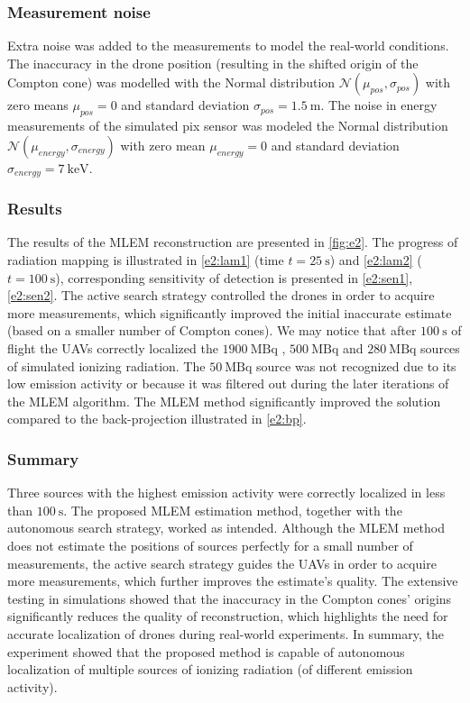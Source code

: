 \subsubsection{Measurement noise}
Extra noise was added to the measurements to model the real-world conditions.
The inaccuracy in the drone position (resulting in the shifted origin of the Compton cone) was modelled with the Normal distribution $\mathcal{N}(\mu_{pos}, \sigma_{pos})$ with zero means $\mu_{pos} = 0$ and standard deviation $\sigma_{pos} = \SI{1.5}{\meter}$. 
The noise in energy measurements of the simulated \ac{pix} sensor was modeled the Normal distribution $\mathcal{N}(\mu_{energy}, \sigma_{energy})$ with zero mean $\mu_{energy} = 0$ and standard deviation $\sigma_{energy} = \SI{7}{\kilo\electronvolt}$.

\subsubsection{Results}
The results of the \ac{MLEM} reconstruction are presented in \autoref{fig:e2}.
The progress of radiation mapping is illustrated in \autoref{e2:lam1} (time $t = \SI{25}{\second}$) and \autoref{e2:lam2} ($t = \SI{100}{\second}$), corresponding sensitivity of detection is presented in \autoref{e2:sen1}, \autoref{e2:sen2}.
The active search strategy controlled the drones in order to acquire more measurements, which significantly improved the initial inaccurate estimate (based on a smaller number of Compton cones).
We may notice that after $\SI{100}{\second}$ of flight the \ac{UAV}s correctly localized the $\SI{1900}{\mega\becquerel}$ , $\SI{500}{\mega\becquerel}$ and $\SI{280}{\mega\becquerel}$ sources of simulated ionizing radiation.
The $\SI{50}{\mega\becquerel}$ source was not recognized due to its low emission activity or because it was filtered out during the later iterations of the \ac{MLEM} algorithm.
The \ac{MLEM} method significantly improved the solution compared to the back-projection illustrated in \autoref{e2:bp}.

\subsubsection{Summary}
Three sources with the highest emission activity were correctly localized in less than $\SI{100}{\second}$.
The proposed \ac{MLEM} estimation method, together with the autonomous search strategy, worked as intended.
Although the \ac{MLEM} method does not estimate the positions of sources perfectly for a small number of measurements, the active search strategy guides the \ac{UAV}s in order to acquire more measurements, which further improves the estimate's quality.
The extensive testing in simulations showed that the inaccuracy in the Compton cones' origins significantly reduces the quality of reconstruction, which highlights the need for accurate localization of drones during real-world experiments.
In summary, the experiment showed that the proposed method is capable of autonomous localization of multiple sources of ionizing radiation (of different emission activity).




